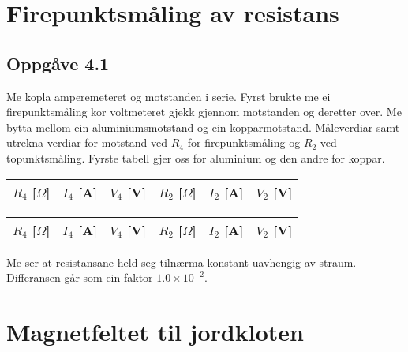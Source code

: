 \documentclass[11pt, a4paper]{article}
\begin{document}
\newpage




\section*{Firepunktsmåling av resistans}


  \subsection*{Oppgåve 4.1}
    Me kopla amperemeteret og motstanden i serie. Fyrst brukte me ei firepunktsmåling kor voltmeteret gjekk gjennom motstanden og 
    deretter over. Me bytta mellom ein aluminiumsmotstand og ein kopparmotstand.
    Måleverdiar samt utrekna verdiar for motstand ved $R_4$ for firepunktsmåling og $R_2$ ved topunktsmåling. Fyrste tabell gjer oss for aluminium og den andre for koppar.
    \begin{center}
      \begin{tabular}{|l||l|l|||l||l|l|}
        \hline
        $R_4$ [$\Omega$] & $I_4$ [A] & $V_4$ [V] & $R_2$ [$\Omega$] & $I_2$ [A] & $V_2$ [V] \\
        \hline
        
        \hline
      \end{tabular}
    \end{center}

    \begin{center}
      \begin{tabular}{|l||l|l|||l||l|l|}
        \hline
        $R_4$ [$\Omega$] & $I_4$ [A] & $V_4$ [V] & $R_2$ [$\Omega$] & $I_2$ [A] & $V_2$ [V] \\
        \hline
        
        \hline
      \end{tabular}
    \end{center}

    Me ser at resistansane held seg tilnærma konstant uavhengig av straum. Differansen går som ein faktor $1.0\times10^{-2}$.

\newpage




\section*{Magnetfeltet til jordkloten}
\end{document}
